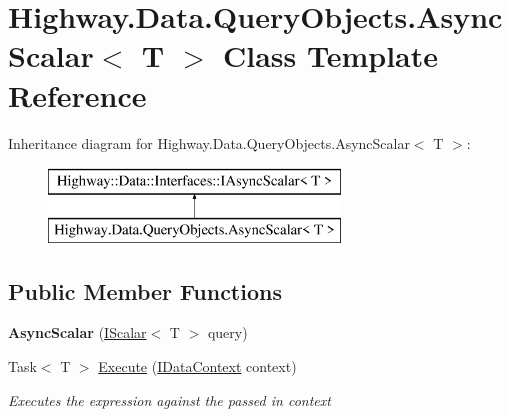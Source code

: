 \hypertarget{class_highway_1_1_data_1_1_query_objects_1_1_async_scalar-g}{\section{Highway.\-Data.\-Query\-Objects.\-Async\-Scalar$<$ T $>$ Class Template Reference}
\label{class_highway_1_1_data_1_1_query_objects_1_1_async_scalar-g}
}
Inheritance diagram for Highway.\-Data.\-Query\-Objects.\-Async\-Scalar$<$ T $>$\-:\begin{figure}[H]
\begin{center}
\leavevmode
\includegraphics[height=2.000000cm]{class_highway_1_1_data_1_1_query_objects_1_1_async_scalar-g}
\end{center}
\end{figure}
\subsection*{Public Member Functions}
\begin{DoxyCompactItemize}
\item 
\hypertarget{class_highway_1_1_data_1_1_query_objects_1_1_async_scalar-g_a639f5795ab4205cd821868fe1a80cc2f}{{\bfseries Async\-Scalar} (\hyperlink{interface_highway_1_1_data_1_1_interfaces_1_1_i_scalar-g}{I\-Scalar}$<$ T $>$ query)}\label{class_highway_1_1_data_1_1_query_objects_1_1_async_scalar-g_a639f5795ab4205cd821868fe1a80cc2f}

\item 
Task$<$ T $>$ \hyperlink{class_highway_1_1_data_1_1_query_objects_1_1_async_scalar-g_af09b943ca549dc089066510ea9fa91a4}{Execute} (\hyperlink{interface_highway_1_1_data_1_1_interfaces_1_1_i_data_context}{I\-Data\-Context} context)
\begin{DoxyCompactList}\small\item\em Executes the expression against the passed in context \end{DoxyCompactList}\end{DoxyCompactItemize}


